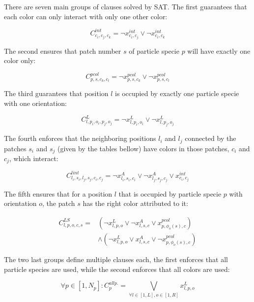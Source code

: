 \documentclass[a4paper, amsfonts, amssymb, amsmath, reprint, showkeys, nofootinbib, twoside]{revtex4-1}
\begin{document}
There are seven main groups of clauses solved by SAT. The first guarantees that each color can only interact with only one other color:

\begin{equation}
C^{int}_{c_i,c_j,c_k}=\neg x_{c_i,c_j}^{int} \vee \neg x_{c_i,c_k}^{int}
\end{equation}

The second ensures that patch number $s$ of particle specie $p$ will have exactly one color only:

\begin{equation}
C^{pcol}_{p,s,c_k,c_l}=\neg x_{p,s,c_k}^{pcol} \vee \neg x_{p,s,c_l}^{pcol}
\end{equation}

The third guarantees that position $l$ is occupied by exactly one particle specie with one orientation:

\begin{equation}
C^{L}_{l,p_i,o_i,p_j,o_j}=\neg x_{l,p_i,o_i}^{L} \vee \neg x_{l,p_j,o_j}^{L}
\end{equation}

The fourth enforces that the neighboring positions $l_i$ and $l_j$ connected by the patches $s_i$ and $s_j$ (given by the tables bellow) have colors in those patches, $c_i$ and $c_j$, which interact:

\begin{equation}
C^{lint}_{l_i,s_i,l_j,s_j,c_i,c_j}=\neg x_{l_i,s_i,c_i}^{A} \vee \neg x_{l_j,s_j,c_j}^{A} \vee x_{c_i,c_j}^{int}
\end{equation}

The fifth ensures that for a position $l$ that is occupied by particle specie $p$ with orientation $o$, the patch $s$ has the right color attributed to it:

\begin{equation}
\begin{split}
C^{LS}_{l,p,o,c,s}= & ( \neg x_{l,p,o}^{L} \vee \neg x_{l,s,c}^{A} \vee x_{p,\phi_o(s), c}^{pcol} ) \\ 
& \wedge ( \neg x_{l,p,o}^{L} \vee x_{l,s,c}^{A} \vee \neg x_{p,\phi_o(s), c}^{pcol} )
\end{split}
\end{equation}

The two last groups define multiple clauses each, the first enforces that all particle species are used, while the second enforces that all colors are used:

\begin{equation}
\forall p\in [1, N_p]:C_p^{all p.}= \underset{\forall l \in [1,L], o\in [1,R]}{\bigvee} x_{l,p,o}^L
\end{equation}
\end{document}
